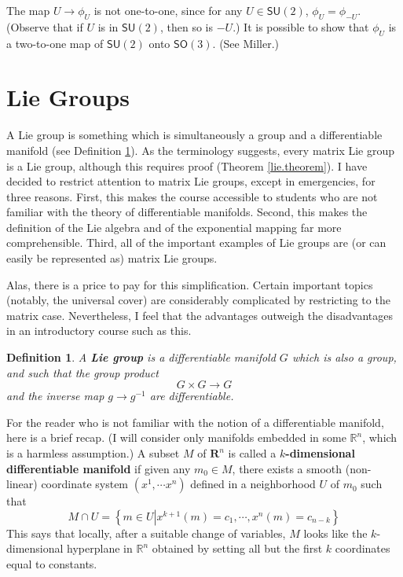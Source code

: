 \documentclass{amsbook}
\theoremstyle{plain}
\newtheorem{definition}[theorem]{Definition}
\numberwithin{equation}{chapter}
\numberwithin{theorem}{chapter}
\begin{document}
The map $U\rightarrow\phi_{U}$ is not one-to-one, since for any $U\in
\mathsf{SU}(2)$, $\phi_{U}=\phi_{-U}$. (Observe that if $U$ is in
$\mathsf{SU}(2)$, then so is $-U$.) It is possible to show that $\phi_{U}$ is
a two-to-one map of $\mathsf{SU}(2)$ onto $\mathsf{SO}(3)$. (See Miller.)

\section{Lie Groups\label{lie.groups}}

A Lie group is something which is simultaneously a group and a differentiable
manifold (see Definition \ref{lie.definition}). As the terminology suggests,
every matrix Lie group is a Lie group, although this requires proof (Theorem
\ref{lie.theorem}). I have decided to restrict attention to matrix Lie groups,
except in emergencies, for three reasons. First, this makes the course
accessible to students who are not familiar with the theory of differentiable
manifolds. Second, this makes the definition of the Lie algebra and of the
exponential mapping far more comprehensible. Third, all of the important
examples of Lie groups are (or can easily be represented as) matrix Lie groups.

Alas, there is a price to pay for this simplification. Certain important
topics (notably, the universal cover) are considerably complicated by
restricting to the matrix case. Nevertheless, I feel that the advantages
outweigh the disadvantages in an introductory course such as this.

\begin{definition}
\label{lie.definition}A \textbf{Lie group} is a differentiable manifold $G$
which is also a group, and such that the group product
\[
G\times G\rightarrow G
\]
and the inverse map $g\rightarrow g^{-1}$ are differentiable.
\end{definition}

For the reader who is not familiar with the notion of a differentiable
manifold, here is a brief recap. (I will consider only manifolds embedded in
some $\mathbb{R}^{n}$, which is a harmless assumption.) A subset $M$ of
$\mathbf{R}^{n}$ is called a $k$\textbf{-dimensional differentiable manifold}
if given any $m_{0}\in M$, there exists a smooth (non-linear) coordinate
system $(x^{1},\cdots x^{n})$ defined in a neighborhood $U$ of $m_{0}$ such
that
\[
M\cap U=\left\{  m\in U\left|  x^{k+1}(m)=c_{1},\cdots,x^{n}(m)=c_{n-k}%
\right.  \right\}
\]
This says that locally, after a suitable change of variables, $M$ looks like
the $k$-dimensional hyperplane in $\mathbb{R}^{n}$ obtained by setting all but
the first $k$ coordinates equal to constants.
\end{document}

